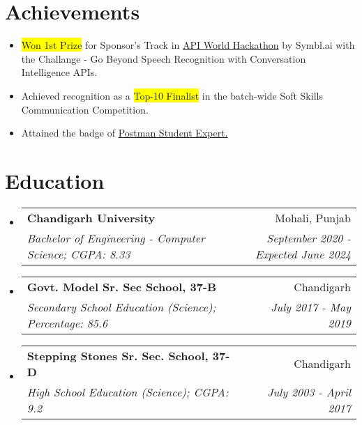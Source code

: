 \documentclass[apaper,20pt]{article}
\makeatletter
\newcommand{\MYhref}[3][primaryColor]{\href{#2}{{\color{#1}#3}}}
\newcommand{\resumeSubheading}[4]{
  \vspace{-1pt}\item
    \begin{tabular*}{0.97\textwidth}{l@{\extracolsep{\fill}}r}
      \textbf{#1} & #2 \\
      \textit{#3} & \textit{#4} \\
    \end{tabular*}\vspace{-5pt}
}
\newcommand{\resumeSubHeadingListStart}{\begin{itemize}[leftmargin=*]}
\newcommand{\resumeSubHeadingListEnd}{\end{itemize}}
\makeatother
\begin{document}

\vspace{-3pt}

\section{Achievements}
\begin{itemize}[labelsep=*,label=$\circ$,leftmargin=0.9pc]
	\item {\colorbox{yellow}{Won 1st Prize} for Sponsor's Track in {\MYhref{https://devpost.com/software/feedback-prime-kbg8um}{API World Hackathon}} by Symbl.ai with the Challange - Go Beyond Speech Recognition with Conversation Intelligence APIs.}
 \vspace{-5pt}
     \item {Achieved recognition as a \colorbox{yellow}{Top-10 Finalist} in the batch-wide Soft Skills Communication Competition.}
\vspace{-5pt}
	\item {Attained the badge of {\MYhref{https://badgr.com/public/assertions/DNG85AU6SYWaX6XO5gkoDw?identity__email=nitish.sharma1186@gmail.com}{Postman Student Expert.}}}
\end{itemize}


\vspace{-6pt}

\section{Education}
\resumeSubHeadingListStart
\resumeSubheading
{Chandigarh University}{Mohali, Punjab}
{Bachelor of Engineering - Computer Science;  CGPA: 8.33}{September 2020 - Expected June 2024}
\vspace{0pt}
\resumeSubheading
{Govt. Model Sr. Sec School, 37-B}{Chandigarh}
{Secondary School Education (Science);  Percentage: 85.6}{July 2017 - May 2019}
\vspace{0pt}
\resumeSubheading
{Stepping Stones Sr. Sec. School, 37-D}{Chandigarh}
{High School Education (Science);  CGPA: 9.2}{July 2003 - April 2017}
\resumeSubHeadingListEnd
\end{document}
